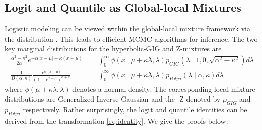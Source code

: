 \documentclass[letterpaper,11pt]{article}
\begin{document}
\subsection{Logit and Quantile as Global-local Mixtures}
Logistic modeling can be viewed within the global-local mixture framework via the \PG distribution \citep{polson2013bayesian}. This leads to efficient MCMC algorithms for inference. The two key marginal distributions for the hyperbolic-GIG \citep{barndorff1977infinite} and Z-\Polya mixtures \citep{polson2013bayesian,barndorff1982normal} are 
\begin{align}
\frac{\alpha^2-\kappa^2}{2\alpha} e^{-\alpha|x-\mu| + \kappa(x-\mu)} & = \int_0^{\infty} \phi(x \mid \mu + \kappa \lambda, \lambda) p_{GIG}(\lambda \mid 1,0,\sqrt{\alpha^2-\kappa^2}) d\lambda \label{eq:GIG}\\
\frac{1}{B(\alpha,\kappa)} \frac{e^{\alpha(x-\mu)}}{(1+e^{x-\mu})^{\alpha + \kappa}} & = \int_0^{\infty} \phi( x \mid \mu + \kappa \lambda, \lambda) p_{Polya}(\lambda \mid \alpha,\kappa)  d\lambda \label{eq:polya}
\end{align}
where $\phi(\mu + \kappa \lambda, \lambda)$ denotes a normal density. The corresponding local mixture distributions are Generalized Inverse-Gaussian and the \Polya-Z denoted by $p_{GIG}$ and $p_{Polya}$ respectively. Rather surprisingly, the logit and quantile identities can be derived from the \CS transformation \eqref{eq:identity}. We give the proofs below: 
\end{document}
